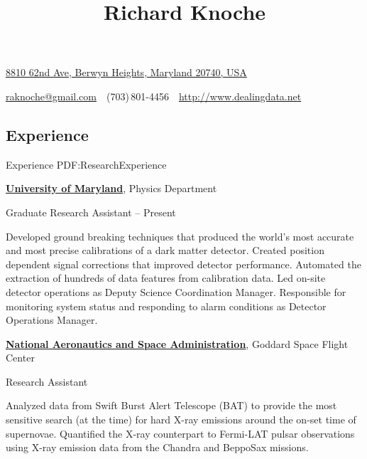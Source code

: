 \documentclass[letterpaper,MMMyyyy,nonstop]{simpleresumecv}
\newcommand{\CVAuthor}{Richard Knoche}
\newcommand{\CVWebpage}{http://www.dealingdata.net}
\begin{document}

\title{\CVAuthor}

\begin{subtitle}
\href{https://www.google.com/maps/place/8810+62nd+Ave,+Berwyn+Heights,+MD+20740/@38.995313,-76.908195,17z/data=!3m1!4b1!4m5!3m4!1s0x89b7c3fd69c6911b:0xa23453a69afa6fc8!8m2!3d38.995313!4d-76.908195}
{8810 62nd Ave, Berwyn Heights, Maryland 20740, USA}
\par
\href{mailto:raknoche@gmail.com}
{raknoche@gmail.com}
\,\SubBulletSymbol\,
(703)\,801-4456
\,\SubBulletSymbol\,
\href{\CVWebpage}
{\CVWebpage}
\end{subtitle}

\begin{body}


\section
{Experience}
{Experience}
{PDF:ResearchExperience}

\href{http://umdphysics.umd.edu/}
{\textbf{University of Maryland}},
Physics Department

\GapNoBreak
\BulletItem
Graduate Research Assistant
\hfill
{} -- Present

\begin{detail}
\SubBulletItem
Developed ground breaking techniques that produced the world's most accurate and most precise calibrations of a dark matter detector.
\SubBulletItem
Created position dependent signal corrections that improved detector performance.
\SubBulletItem
Automated the extraction of hundreds of data features from calibration data.
\SubBulletItem
Led on-site detector operations as Deputy Science Coordination Manager.
\SubBulletItem
Responsible for monitoring system status and responding to alarm conditions as Detector Operations Manager.
\end{detail}

\BigGap
\href{http://csma31.csm.jmu.edu/physics/}
{\textbf{National Aeronautics and Space Administration}},
Goddard Space Flight Center

\GapNoBreak
\BulletItem
Research Assistant
\hfill
{}

\begin{detail}
\SubBulletItem
Analyzed data from Swift Burst Alert Telescope (BAT) to provide the most sensitive search (at the time) for hard X-ray emissions around the on-set time of supernovae.
\SubBulletItem
Quantified the X-ray counterpart to Fermi-LAT pulsar observations using X-ray emission data from the Chandra and BeppoSax missions.
\end{detail}


\end{body}
\end{document}
